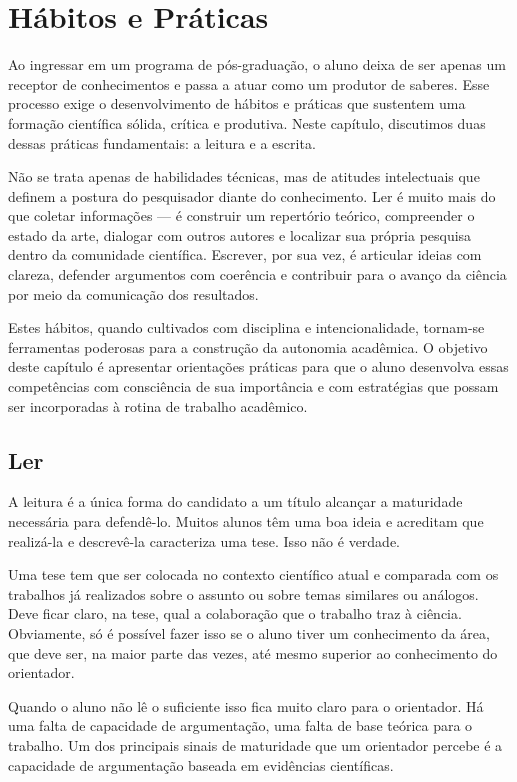 \chapter{Hábitos e Práticas}


Ao ingressar em um programa de pós-graduação, o aluno deixa de ser apenas um receptor de conhecimentos e passa a atuar como um produtor de saberes. Esse processo exige o desenvolvimento de hábitos e práticas que sustentem uma formação científica sólida, crítica e produtiva. Neste capítulo, discutimos duas dessas práticas fundamentais: a leitura e a escrita.

Não se trata apenas de habilidades técnicas, mas de atitudes intelectuais que definem a postura do pesquisador diante do conhecimento. Ler é muito mais do que coletar informações — é construir um repertório teórico, compreender o estado da arte, dialogar com outros autores e localizar sua própria pesquisa dentro da comunidade científica. Escrever, por sua vez, é articular ideias com clareza, defender argumentos com coerência e contribuir para o avanço da ciência por meio da comunicação dos resultados.

Estes hábitos, quando cultivados com disciplina e intencionalidade, tornam-se ferramentas poderosas para a construção da autonomia acadêmica. O objetivo deste capítulo é apresentar orientações práticas para que o aluno desenvolva essas competências com consciência de sua importância e com estratégias que possam ser incorporadas à rotina de trabalho acadêmico.


\section{Ler}


A leitura é a única forma do candidato a um título alcançar a maturidade necessária para defendê-lo. Muitos alunos têm uma boa ideia e acreditam que realizá-la e descrevê-la caracteriza uma tese. Isso não é verdade. 




Uma tese tem que ser colocada no contexto científico atual e comparada com os trabalhos já realizados sobre o assunto ou sobre temas similares ou análogos. Deve ficar claro, na tese, qual a colaboração que o trabalho traz à ciência. Obviamente, só é possível fazer isso se o aluno tiver um conhecimento da área, que deve ser, na maior parte das vezes, até mesmo superior ao conhecimento do orientador.


Quando o aluno não lê o suficiente isso fica muito claro para o orientador. Há uma falta de capacidade de argumentação, uma falta de base teórica para o trabalho. Um dos principais sinais de maturidade que um orientador percebe é a capacidade de argumentação baseada em evidências científicas.


